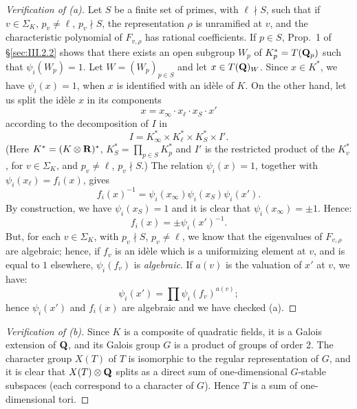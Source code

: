 \begin{proof}[Verification of (a)]
Let $S$ be a finite set of primes, with $\ell\nmid S$, such that if
$v\in\Sigma_K$, $p_v\neq\ell$, $p_v\nmid S$, the representation
$\rho$ is unramified at $v$, and the characteristic polynomial of
$F_{v,\rho}$ has rational coefficients.  If $p\in S$, Prop.~1 of
\S\ref{sec:III.2.2} shows that there exists an open subgroup $W_p$
of $K_p^*=T(\mathbf{Q}_p)$ such that $\psi_i(W_p)=1$.  Let
$W=(W_p)_{p\in S}$ and let $x\in T(\mathbf{Q})_W$.  Since $x\in K^*$, we
have $\psi_i(x)=1$, when $x$ is identified with an idèle of $K$.
On the other hand, let us split the idèle $x$ in its components
\[
x=x_\infty\cdot x_\ell\cdot x_S\cdot x'
\]
according to the decomposition of $I$ in
\[
I=K_\infty^*\times K_\ell^*\times K_S^*\times I'.
\]
(Here $K^*=(K\mathbin{\otimes}\mathbf{R})^*$,
$K_S^*=\prod\limits_{p\in S}K_p^*$ and $I'$ is the restricted
product of the $K_v^*$, for $v\in\Sigma_K$, and $p_v\neq\ell$,
$p_v\nmid S$.)  The relation $\psi_i(x)=1$, together with
$\psi_i(x_\ell)=f_i(x)$, gives
\[
f_i(x)^{-1}=\psi_i(x_\infty)\psi_i(x_S)\psi_i(x').
\]
By construction, we have $\psi_i(x_S)=1$ and it is clear that
$\psi_i(x_\infty)=\pm 1$.  Hence:
\[
f_i(x)=\pm\psi_i(x')^{-1}.
\]
But, for each $v\in\Sigma_K$, with $p_v\nmid S$, $p_v\neq\ell$, we
know that the eigenvalues of $F_{v,\rho}$ are algebraic; hence, if
$f_v$ is an idèle which is a uniformizing element at $v$, and is
equal to $1$ elsewhere, $\psi_i(f_v)$ is \emph{algebraic}.  If
$a(v)$ is the valuation of $x'$ at $v$, we have:
\[
\psi_i(x')=\prod\psi_i(f_v)^{a(v)};
\]
hence $\psi_i(x')$ and $f_i(x)$ are algebraic and we have checked
(a).
\end{proof}

\begin{proof}[Verification of (b)]
Since $K$ is a composite of quadratic fields, it is a Galois
extension of $\mathbf{Q}$, and its Galois group $G$ is a product of groups
of order 2.  The character group $X(T)$ of $T$ is isomorphic to the
regular representation of $G$, and it is clear that $X(T)\mathbin{\otimes}\mathbf{Q}$
splits as a direct sum of one-dimensional $G$-stable subspaces
(each correspond to a character of $G$).  Hence $T$ is a sum of
one-dimensional tori.
\end{proof}


